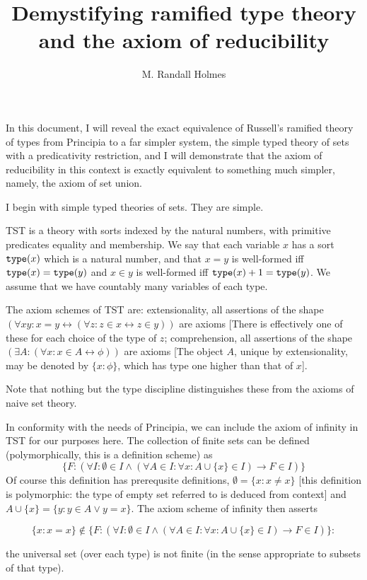 \documentclass[12pt]{article}
\title{Demystifying ramified type theory and the axiom of reducibility}
\author{M. Randall Holmes}
\begin{document}
\maketitle

In this document, I will reveal the exact equivalence of Russell's ramified theory of types from Principia to a far simpler system, 
the simple typed theory of sets with a predicativity restriction, and I will demonstrate that the axiom of reducibility in this context is exactly equivalent to something much simpler, namely, the axiom of set union.

I begin with simple typed theories of sets.  They are simple.

TST is a theory with sorts indexed by the natural numbers, with primitive predicates equality and membership.  We say that each variable $x$ has a sort ${\tt type}(x)$ which is a natural number, and that $x=y$ is well-formed iff ${\tt type}(x)={\tt type}(y)$ and $x \in y$ is well-formed iff ${\tt type}(x)+1 = {\tt type}(y)$.  We assume that we have countably many variables of each type.

The axiom schemes of TST are:  extensionality, all assertions of the shape $(\forall xy:x=y \leftrightarrow (\forall z:z \in x \leftrightarrow z \in y))$ are axioms [There is effectively one of these for each choice of the type of $z$; comprehension,
all assertions of the shape $(\exists A:(\forall x:x\in A\leftrightarrow \phi))$ are axioms [The object $A$, unique by extensionality, may be denoted by $\{x:\phi\}$, which has type one higher than that of $x$].

Note that nothing but the type discipline distinguishes these from the axioms of naive set theory.

In conformity with the needs of Principia, we can include the axiom of infinity in TST for our purposes here.  The collection of finite sets can be defined (polymorphically, this is a definition scheme) as $$\{F:(\forall I:\emptyset \in I \wedge (\forall A\in I:\forall x:A \cup \{x\} \in I) \rightarrow F \in I)\}$$  Of course this definition has prerequsite definitions, $\emptyset = \{x:x \neq x\}$ [this definition is polymorphic:  the type of empty set referred to is deduced from context] and $A \cup \{x\} = \{y:y \in A \vee y=x\}$.  The axiom scheme of infinity then asserts 

$$\{x:x=x\} \not\in \{F:(\forall I:\emptyset \in I \wedge (\forall A\in I:\forall x:A \cup \{x\} \in I) \rightarrow F \in I)\}:$$

the universal set (over each type) is not finite (in the sense appropriate to subsets of that type).
\end{document}
